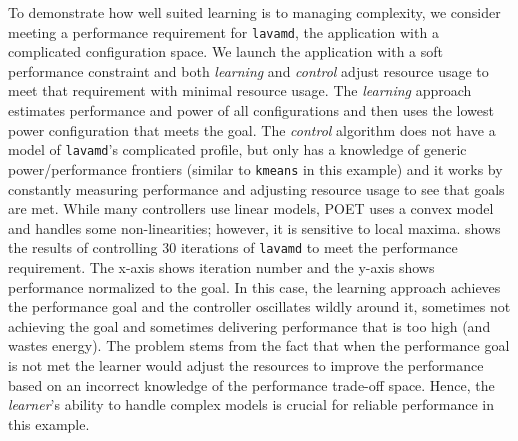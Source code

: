 To demonstrate how well suited learning is to managing complexity, we
consider meeting a performance requirement for \texttt{lavamd}, the
application with a complicated configuration space.  We launch the
application with a soft performance constraint and both
\emph{learning} and \emph{control} adjust resource usage to meet that
requirement with minimal resource usage.  The \emph{learning} approach
estimates performance and power of all configurations and then uses
the lowest power configuration that meets the goal.  The
\emph{control} algorithm does not have a model of \texttt{lavamd}'s
complicated profile, but only has a knowledge of generic
power/performance frontiers (similar to \texttt{kmeans} in this
example) and it works by constantly measuring performance and
adjusting resource usage to see that goals are met.  While many
controllers use linear models, POET uses a convex model and handles
some non-linearities; however, it is sensitive to local maxima.
  shows the results of controlling 30
iterations of \texttt{lavamd} to meet the performance requirement.
The x-axis shows iteration number and the y-axis shows performance
normalized to the
goal.  %
In this case, the learning approach achieves the performance goal and
the controller oscillates wildly around it, sometimes not achieving
the goal and sometimes delivering performance that is too high (and
wastes energy). The problem stems from the fact that when the
performance goal is not met the learner would adjust the resources to
improve the performance based on an incorrect knowledge of the
performance trade-off space. Hence, the \emph{learner}'s ability to
handle complex models is crucial for reliable performance in this
example.


